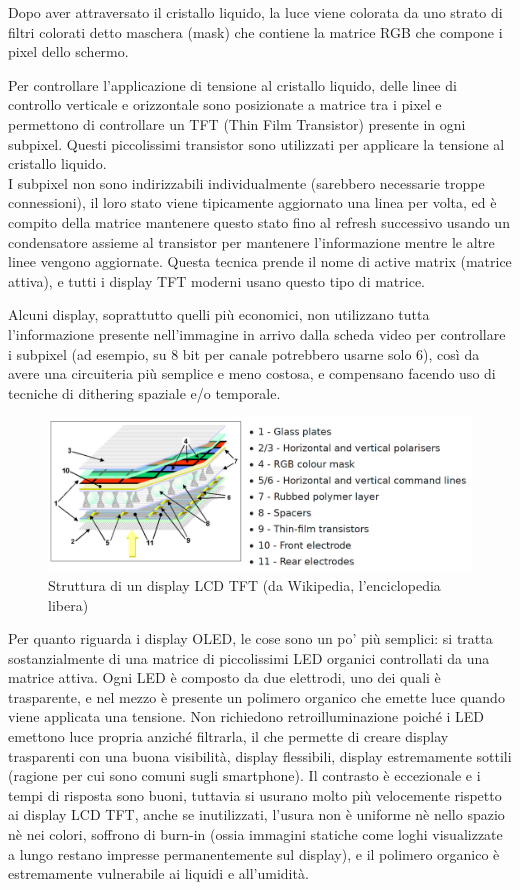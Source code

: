 Dopo aver attraversato il cristallo liquido, la luce viene colorata da uno strato di filtri colorati detto maschera (mask) che contiene la matrice RGB che compone i pixel dello schermo.

Per controllare l'applicazione di tensione al cristallo liquido, delle linee di controllo verticale e orizzontale sono posizionate a matrice tra i pixel e permettono di controllare un TFT (Thin Film Transistor) presente in ogni subpixel. Questi piccolissimi transistor sono utilizzati per applicare la tensione al cristallo liquido.\\
I subpixel non sono indirizzabili individualmente (sarebbero necessarie troppe connessioni), il loro stato viene tipicamente aggiornato una linea per volta, ed è compito della matrice mantenere questo stato fino al refresh successivo usando un condensatore assieme al transistor per mantenere l'informazione mentre le altre linee vengono aggiornate. Questa tecnica prende il nome di active matrix (matrice attiva), e tutti i display TFT moderni usano questo tipo di matrice.

Alcuni display, soprattutto quelli più economici, non utilizzano tutta l'informazione presente nell'immagine in arrivo dalla scheda video per controllare i subpixel (ad esempio, su 8 bit per canale potrebbero usarne solo 6), così da avere una circuiteria più semplice e meno costosa, e compensano facendo uso di tecniche di dithering spaziale e/o temporale.

\begin{figure}[h]
	\centering
	\includegraphics[width=\textwidth]{Chapter01/res/lcdtft.png}
	\caption{Struttura di un display LCD TFT (da Wikipedia, l'enciclopedia libera)}
	\label{fig:lcdtft}
\end{figure}

Per quanto riguarda i display OLED, le cose sono un po' più semplici: si tratta sostanzialmente di una matrice di piccolissimi LED organici controllati da una matrice attiva. Ogni LED è composto da due elettrodi, uno dei quali è trasparente, e nel mezzo è presente un polimero organico che emette luce quando viene applicata una tensione. Non richiedono retroilluminazione poiché i LED emettono luce propria anziché filtrarla, il che permette di creare display trasparenti con una buona visibilità, display flessibili, display estremamente sottili (ragione per cui sono comuni sugli smartphone). Il contrasto è eccezionale e i tempi di risposta sono buoni, tuttavia si usurano molto più velocemente rispetto ai display LCD TFT, anche se inutilizzati, l'usura non è uniforme nè nello spazio nè nei colori, soffrono di burn-in (ossia immagini statiche come loghi visualizzate a lungo restano impresse permanentemente sul display), e il polimero organico è estremamente vulnerabile ai liquidi e all'umidità.

